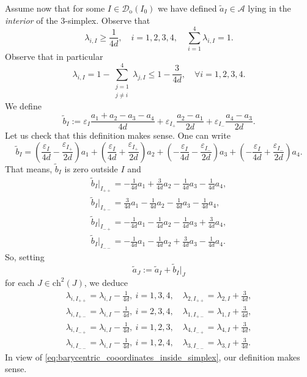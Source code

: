 \documentclass{amsart}
\newcommand{\cA}{\mathcal{A}}
\newcommand{\cD}{\mathcal{D}}
\newcommand{\wt}{\widetilde}
\theoremstyle{definition}
\theoremstyle{remark}
\begin{document}
Assume now that for some $I\in\cD_{\mathrm{o}}(I_0)$ we have defined $\wt{a}_{I}\in\cA$ lying in the \emph{interior} of the $3$-simplex. Observe that
\begin{equation}
    \label{eq:barycentric_cooordinates_inside_simplex}
    \lambda_{i,I}\geq\frac{1}{4d},\quad i=1,2,3,4,\quad\sum_{i=1}^{4}\lambda_{i,I}=1.
\end{equation}
Observe that in particular
\begin{equation*}
    \lambda_{i,I} = 1 - \sum_{\substack{j=1\\j\neq i}}^{4}\lambda_{j,I}
    \leq 1- \frac{3}{4d},\quad\forall i=1,2,3,4.
\end{equation*}
We define
\begin{equation*}
    \wt{b}_{I}:=\varepsilon_{I}\frac{a_1+a_2-a_3-a_4}{4d}+\varepsilon_{I_{+}}\frac{a_2-a_1}{2d}+\varepsilon_{I_{-}}\frac{a_4-a_3}{2d}.
\end{equation*}
Let us check that this definition makes sense. One can write
\begin{equation*}
    \wt{b}_{I}=\left(\frac{\varepsilon_{I}}{4d}-\frac{\varepsilon_{I_{+}}}{2d}\right)a_1
    +\left(\frac{\varepsilon_{I}}{4d}+\frac{\varepsilon_{I_{+}}}{2d}\right)a_2
    +\left(-\frac{\varepsilon_{I}}{4d}-\frac{\varepsilon_{I_{-}}}{2d}\right)a_3
    +\left(-\frac{\varepsilon_{I}}{4d}+\frac{\varepsilon_{I_{-}}}{2d}\right)a_4.
\end{equation*}
That means, $\wt{b}_{I}$ is zero outside $I$ and
\begin{gather*}
    \wt{b}_{I}|_{I_{++}}=-\frac{1}{4d}a_1+\frac{3}{4d}a_2-\frac{1}{4d}a_3-\frac{1}{4d}a_4,\\
    \wt{b}_{I}|_{I_{+-}}=\frac{3}{4d}a_1-\frac{1}{4d}a_2-\frac{1}{4d}a_3-\frac{1}{4d}a_4,\\
    \wt{b}_{I}|_{I_{-+}}=-\frac{1}{4d}a_1-\frac{1}{4d}a_2-\frac{1}{4d}a_3+\frac{3}{4d}a_4,\\
    \wt{b}_{I}|_{I_{--}}=-\frac{1}{4d}a_1-\frac{1}{4d}a_2+\frac{3}{4d}a_3-\frac{1}{4d}a_4.
\end{gather*}
So, setting
\begin{equation*}
    \wt{a}_{J}:=\wt{a}_{I}+\wt{b}_{I}|_{J}
\end{equation*}
for each $J\in\mathrm{ch}^2(J)$, we deduce
\begin{gather*}
    \lambda_{i,I_{++}}=\lambda_{i,I}-\frac{1}{4d},~i=1,3,4,\quad
    \lambda_{2,I_{++}}=\lambda_{2,I}+\frac{3}{4d},\\
    \lambda_{i,I_{+-}}=\lambda_{i,I}-\frac{1}{4d},~i=2,3,4,\quad
    \lambda_{1,I_{+-}}=\lambda_{1,I}+\frac{3}{4d},\\
    \lambda_{i,I_{-+}}=\lambda_{i,I}-\frac{1}{4d},~i=1,2,3,\quad
    \lambda_{4,I_{-+}}=\lambda_{4,I}+\frac{3}{4d},\\
    \lambda_{i,I_{--}}=\lambda_{i,I}-\frac{1}{4d},~i=1,2,4,\quad
    \lambda_{3,I_{--}}=\lambda_{3,I}+\frac{3}{4d}.
\end{gather*}
In view of \eqref{eq:barycentric_cooordinates_inside_simplex}, our definition makes sense.
\end{document}
